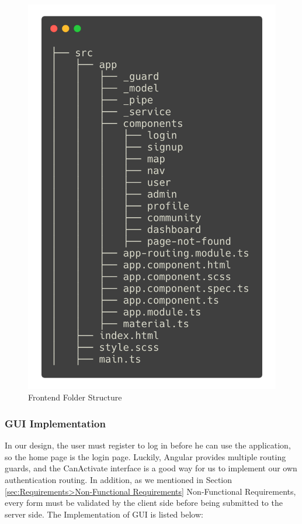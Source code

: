 \begin{figure}[htbp]
  \includegraphics[width=\textwidth]{section04/assets/Frontend.png}
  \caption{Frontend Folder Structure}
  \label{fig:Frontend Folder Structure}
\end{figure}

\subsubsection{GUI Implementation}
In our design, the user must register to log in before he can use the application, so the home page is the login page. Luckily, Angular provides multiple routing guards, and the CanActivate interface is a good way for us to implement our own authentication routing. In addition, as we mentioned in Section \ref{sec:Requirements>Non-Functional Requirements} Non-Functional Requirements, every form must be validated by the client side before being submitted to the server side. The Implementation of GUI is listed below:

